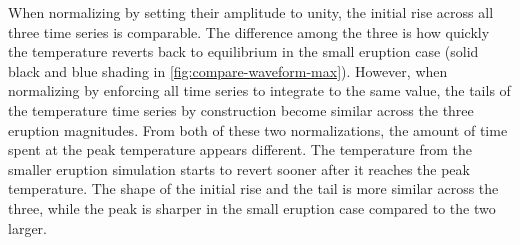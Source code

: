 \documentclass{ametsocV5}
\begin{document}
When normalizing by setting their amplitude to unity, the initial rise across all three
time series is comparable. The difference among the three is how quickly the temperature
reverts back to equilibrium in the small eruption case (solid black and blue shading in
\cref{fig:compare-waveform-max}). However, when normalizing by enforcing all time series
to integrate to the same value, the tails of the temperature time series by construction
become similar across the three eruption magnitudes. From both of these two
normalizations, the amount of time spent at the peak temperature appears different. The
temperature from the smaller eruption simulation starts to revert sooner after it
reaches the peak temperature. The shape of the initial rise and the tail is more similar
across the three, while the peak is sharper in the small eruption case compared to the
two larger.

\end{document}
